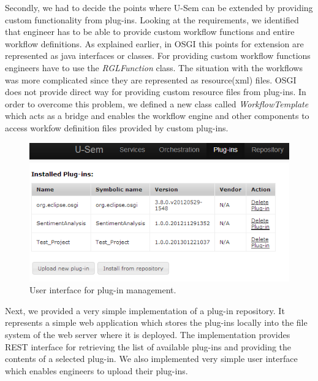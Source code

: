 Secondly, we had to decide the points where U-Sem can be extended by providing custom functionality from plug-ins. Looking at the requirements, we identified that engineer has to be able to provide custom workflow functions and entire workflow definitions. As explained earlier, in OSGI this points for extension are represented as java interfaces or classes. For providing custom workflow functions engineers have to use the \textit{RGLFunction} class. The situation with the workflows was more complicated since they are represented as resource(xml) files. OSGI does not provide direct way for providing custom resource files from plug-ins. In order to overcome this problem, we defined a new class called \textit{WorkflowTemplate} which acts as a bridge and enables the workflow engine and other components to access workfow definition files provided by custom plug-ins.

\begin{figure}[h!]
  \centering
  	\includegraphics[scale=0.70]{plug-in/ui/list.png}
  \caption{User interface for plug-in management.}
  \label{list_ui}
\end{figure}

Next, we provided a very simple implementation of a plug-in repository. It represents a simple web application which stores the plug-ins locally into the file system of the web server where it is deployed. The implementation provides REST interface for retrieving the list of available plug-ins and providing the contents of a selected plug-in. We also implemented very simple user interface which enables engineers to upload their plug-ins. 


